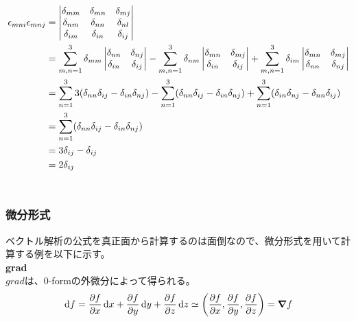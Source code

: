 \documentclass[a4paper,11pt]{jsarticle}
\numberwithin{equation}{section}
\begin{document}
  \begin{align}
  \epsilon_{mni} \epsilon_{mnj} 
  &=
  \begin{vmatrix}
  \delta_{mm} & \delta_{mn} & \delta_{mj} \\
  \delta_{nm} & \delta_{nn} & \delta_{nl} \\
  \delta_{im} & \delta_{in} & \delta_{ij}
  \end{vmatrix} \notag \\
  &= \sum_{m,n=1}^{3} \delta_{mm}
  \begin{vmatrix}
  \delta_{nn} & \delta_{nj} \\
  \delta_{in} & \delta_{ij}
  \end{vmatrix}
  - \sum_{m,n=1}^{3} \delta_{nm}
  \begin{vmatrix}
  \delta_{mn} & \delta_{mj} \\
  \delta_{in} & \delta_{ij}
  \end{vmatrix}
  + \sum_{m,n=1}^{3} \delta_{im}
  \begin{vmatrix}
  \delta_{mn} & \delta_{mj} \\
  \delta_{nn} & \delta_{nj}
  \end{vmatrix} \notag \\
  &= \sum_{n=1}^{3} 3 (\delta_{nn} \delta_{ij} - \delta_{in} \delta_{nj}) 
  - \sum_{n=1}^{3} (\delta_{nn} \delta_{ij} - \delta_{in} \delta_{nj})
  + \sum_{n=1}^{3} (\delta_{in} \delta_{nj} - \delta_{nn} \delta_{ij}) \notag \\
  &= \sum_{n=1}^{3} (\delta_{nn} \delta_{ij} - \delta_{in} \delta_{nj}) \notag \\
  &= 3 \delta_{ij} - \delta_{ij} \notag \\
  &= 2 \delta_{ij}
  \end{align}
  \hfill\qedsymbol\\

\subsubsection{微分形式}
ベクトル解析の公式を真正面から計算するのは面倒なので、微分形式を用いて計算する例を以下に示す。\\
\textbf{grad}\\
$grad$は、0-formの外微分によって得られる。
\begin{align}
  \dd{f} = \pdv{f}{x}\dd{x} + \pdv{f}{y}\dd{y} +\pdv{f}{z}\dd{z} \simeq \qty(\pdv{f}{x},\pdv{f}{y},\pdv{f}{z}) = \grad{f}
\end{align}
\end{document}
